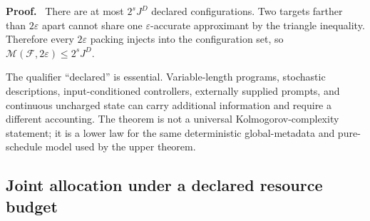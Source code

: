 \documentclass[twoside,11pt]{article}
\renewenvironment{proof}[1][Proof]{\par\noindent\textbf{#1.}\ }{\hfill\BlackBox\par\medskip}
\begin{document}

\begin{proof}
There are at most $2^sJ^D$ declared configurations.  Two targets farther than $2\varepsilon$ apart cannot share one $\varepsilon$-accurate approximant by the triangle inequality.  Therefore every $2\varepsilon$ packing injects into the configuration set, so $\mathcal M(\mathcal F,2\varepsilon)\le2^sJ^D$.
\end{proof}

The qualifier ``declared'' is essential.  Variable-length programs, stochastic descriptions, input-conditioned controllers, externally supplied prompts, and continuous uncharged state can carry additional information and require a different accounting.  The theorem is not a universal Kolmogorov-complexity statement; it is a lower law for the same deterministic global-metadata and pure-schedule model used by the upper theorem.

\subsection{Joint allocation under a declared resource budget}
\label{sec:budget-allocation-main}
\end{document}
